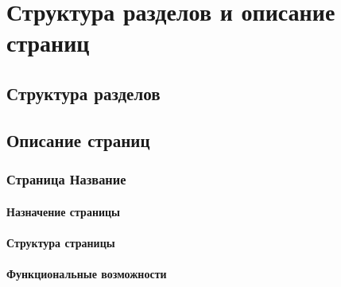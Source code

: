 \section{Структура разделов и описание страниц}
\subsection{Структура разделов}

\subsection{Описание страниц}
\subsubsection{Страница Название}

\paragraph{Назначение страницы}
\paragraph{Структура страницы}
\paragraph{Функциональные возможности}

